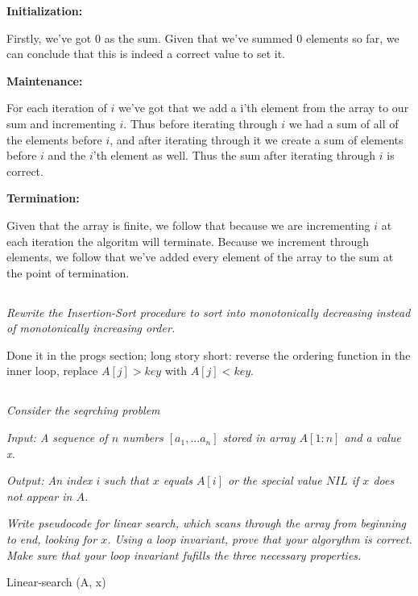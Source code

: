 \documentclass[11pt,oneside,titlepage]{book}
\begin{document}
\textbf{Initialization: }

Firstly, we've got 0 as the sum. Given that we've summed 0 elements so far, we can conclude
that this is indeed a correct value to set it.

\textbf{Maintenance: }

For each iteration of $i$ we've got that we add a i'th element from the array to our sum and
incrementing $i$. Thus before iterating through $i$ we had a sum of all of the elements
before $i$, and after iterating through it we create a sum of elements before $i$ and
the $i$'th element as well. Thus the sum after iterating through $i$ is correct.

\textbf{Termination: }

Given that the array is finite, we follow that because we are incrementing $i$ at each
iteration the algoritm will terminate. Because we increment through elements, we follow that
we've added every element of the array to the sum at the point of termination.

\subsection{}

\textit{Rewrite the Insertion-Sort procedure to sort into monotonically decreasing instead
  of monotonically increasing order.}

Done it in the progs section; long story short: reverse the ordering function in the inner loop,
replace  $A[j] > key$ with $A[j] < key$.

\subsection{}

\textit{Consider the seqrching problem}

\textit{Input: A sequence of $n$ numbers $[a_1, ... a_n]$ stored in array $A[1:n]$ and a
  value x.}

\textit{Output: An index $i$ such that $x$ equals $A[i]$ or the special value $NIL$ if $x$
  does not appear in $A$.}

\textit{Write pseudocode for linear search, which scans through the array from beginning to
  end, looking for $x$. Using a loop invariant, prove that your algorythm is correct.
  Make sure that your loop invariant fufills the three necessary properties.}

\begin{function}
  \caption{Linear-search (A, x)}
  \;

\end{function}
\end{document}
